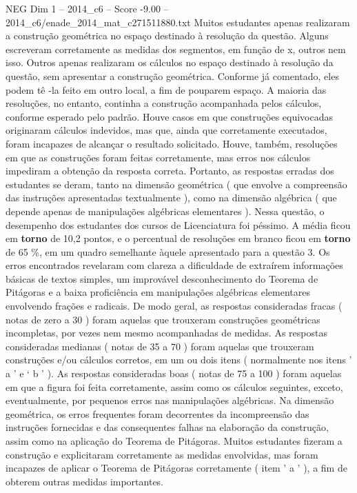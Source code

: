 \begin{textsample}{NEG Dim 1 – 2014\_c6 – Score -9.00 – 2014\_c6/enade\_2014\_mat\_c271511880.txt}
Muitos estudantes apenas realizaram a construção geométrica no espaço destinado à resolução da questão.
Alguns escreveram corretamente as medidas dos segmentos, em função de x, outros nem isso.
Outros apenas realizaram os cálculos no espaço destinado à resolução da questão, sem apresentar a construção geométrica.
Conforme já comentado, eles podem tê -la feito em outro local, a fim de pouparem espaço.
A maioria das resoluções, no entanto, continha a construção acompanhada pelos cálculos, conforme esperado pelo padrão.
Houve casos em que construções equivocadas originaram cálculos indevidos, mas que, ainda que corretamente executados, foram incapazes de alcançar o resultado solicitado.
Houve, também, resoluções em que as construções foram feitas corretamente, mas erros nos cálculos impediram a obtenção da resposta correta.
Portanto, as respostas erradas dos estudantes se deram, tanto na dimensão geométrica ( que envolve a compreensão das instruções apresentadas textualmente ), como na dimensão algébrica ( que depende apenas de manipulações algébricas elementares ).
Nessa questão, o desempenho dos estudantes dos cursos de Licenciatura foi péssimo.
A média ficou em \textbf{torno} de 10,2 pontos, e o percentual de resoluções em branco ficou em \textbf{torno} de 65 \%, em um quadro semelhante àquele apresentado para a questão 3.
Os erros encontrados revelaram com clareza a dificuldade de extraírem informações básicas de textos simples, um improvável desconhecimento do Teorema de Pitágoras e a baixa proficiência em manipulações algébricas elementares envolvendo frações e radicais.
De modo geral, as respostas consideradas fracas ( notas de zero a 30 ) foram aquelas que trouxeram construções geométricas incompletas, por vezes nem mesmo acompanhadas de medidas.
As respostas consideradas medianas ( notas de 35 a 70 ) foram aquelas que trouxeram construções e/ou cálculos corretos, em um ou dois itens ( normalmente nos itens ’ a ’ e ‘ b ’ ).
As respostas consideradas boas ( notas de 75 a 100 ) foram aquelas em que a figura foi feita corretamente, assim como os cálculos seguintes, exceto, eventualmente, por pequenos erros nas manipulações algébricas.
Na dimensão geométrica, os erros frequentes foram decorrentes da incompreensão das instruções fornecidas e das consequentes falhas na elaboração da construção, assim como na aplicação do Teorema de Pitágoras.
Muitos estudantes fizeram a construção e explicitaram corretamente as medidas envolvidas, mas foram incapazes de aplicar o Teorema de Pitágoras corretamente ( item ’ a ’ ), a fim de obterem outras medidas importantes.

\end{textsample}
